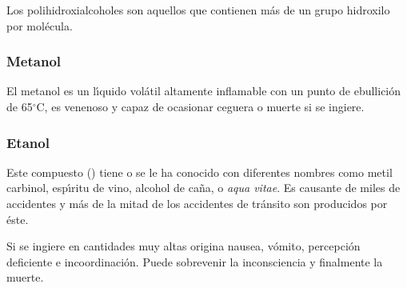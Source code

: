 Los polihidroxialcoholes  son aquellos que contienen m\'as de un grupo hidroxilo por mol\'ecula.

\subsubsection{Metanol }

El metanol  es un l\'{\i}quido vol\'atil altamente inflamable con un punto de ebu\-lli\-ci\'on de 65$^\circ$C, es venenoso y capaz de ocasionar ceguera o muerte si se ingiere.

\subsubsection{Etanol}
Este compuesto () tiene o se le ha conocido con diferentes nombres como metil carbinol,  es\-p\'{\i}\-ri\-tu de vino, alcohol de ca\~na, o \textit{aqua vitae}. Es  causante de miles de accidentes y m\'as de la mitad de los accidentes de tr\'ansito son producidos por \'este.

Si se ingiere en cantidades muy altas origina nausea, v\'omito, percepci\'on deficiente e incoordinaci\'on. Puede sobrevenir la inconsciencia y finalmente la muerte.

